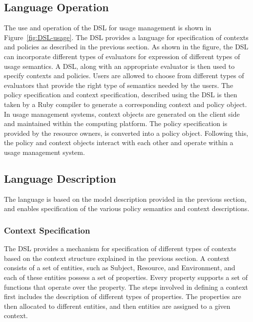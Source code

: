 \subsection{Language Operation}
The use and operation of the DSL for usage management is shown in Figure~\ref{fig:DSL-usage}. The DSL provides a language for specification of contexts and policies as described in the previous section. As shown in the figure, the DSL can incorporate different types of evaluators for expression of different types of usage semantics. A DSL, along with an appropriate evaluator is then used to specify contexts and policies. Users are allowed to choose from different types of evaluators that provide the right type of semantics needed by the users. The policy specification and context specification, described using the DSL is then taken by a Ruby compiler to generate a corresponding context and policy object. In usage management systems, context objects are generated on the client side and maintained within the computing platform. The policy specification is provided by the resource owners, is converted into a policy object. Following this, the policy and context objects interact with each other and operate within a usage management system.  

\subsection{Language Description}
The language is based on the model description provided in the previous section, and enables specification of the various policy semantics and context descriptions. 

\subsubsection{Context Specification}
The DSL provides a mechanism for specification of different types of contexts based on the context structure explained in the previous section. A context consists of a set of entities, such as Subject, Resource, and Environment, and each of these entities possess a set of properties. Every property supports a set of functions that operate over the property. The steps involved in defining a context first includes the description of different types of properties. The properties are then allocated to different entities, and then entities are assigned to a given context. 

